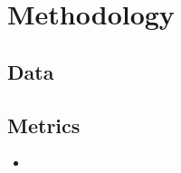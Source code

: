 \chapter{Methodology}
\label{chap:methods}

\section{Data}

\section{Metrics}

\begin{itemize}
    \item 
\end{itemize}